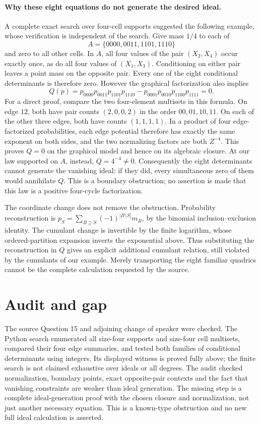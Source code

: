 \documentclass[11pt]{article}
\begin{document}
\paragraph{Why these eight equations do not generate the desired ideal.}
A complete exact search over four-cell supports suggested the following
example, whose verification is independent of the search. Give mass
$1/4$ to each of
\[
A=\{0000,0011,1101,1110\}
\]
and zero to all other cells. In $A$, all four values of the pair $(X_2,X_4)$
occur exactly once, as do all four values of $(X_1,X_3)$. Conditioning
on either pair leaves a point mass on the opposite pair. Every one of
the eight conditional determinants is therefore zero.
However the graphical factorization also implies
\[
Q(p)=p_{0000}p_{0011}p_{1101}p_{1110}
       -p_{0001}p_{0010}p_{1100}p_{1111}=0.
\]
For a direct proof, compare the two four-element multisets in this
formula. On edge $12$, both have pair counts $(2,0,0,2)$ in the order
$00,01,10,11$. On each of the other three edges, both have counts
$(1,1,1,1)$. In a product of four edge-factorized probabilities,
each edge potential therefore has exactly the same exponent on both
sides, and the two normalizing factors are both $Z^{-4}$. This proves
$Q=0$ on the graphical model and hence on its algebraic closure.
At our law supported on $A$, instead, $Q=4^{-4}\ne0$.
Consequently the eight determinants cannot generate the vanishing ideal:
if they did, every simultaneous zero of them would annihilate $Q$.
This is a boundary obstruction; no assertion is made that this law is a
positive four-cycle factorization.

The coordinate change does not remove the obstruction. Probability
reconstruction is
$p_S=\sum_{B\supseteq S}(-1)^{|B\setminus S|}m_B$, by the binomial
inclusion--exclusion identity. The cumulant change is invertible by the
finite logarithm, whose ordered-partition expansion inverts the
exponential above. Thus substituting the reconstruction in $Q$ gives
an explicit additional cumulant relation, still violated by the
cumulants of our example. Merely transporting the eight familiar
quadrics cannot be the complete calculation requested by the source.

\section{Audit and gap}
The source Question 15 and adjoining change of speaker were checked.
The Python search enumerated all size-four supports and size-four cell
multisets, compared their four edge summaries, and tested both families
of conditional determinants using integers. Its displayed witness is
proved fully above; the finite search is not claimed exhaustive over
ideals or all degrees. The audit checked normalization, boundary points,
exact opposite-pair contexts and the fact that vanishing constraints
are weaker than ideal generation. The missing step is a complete
ideal-generation proof with the chosen closure and normalization, not
just another necessary equation. This is a known-type obstruction and
no new full ideal calculation is asserted.
\end{document}
